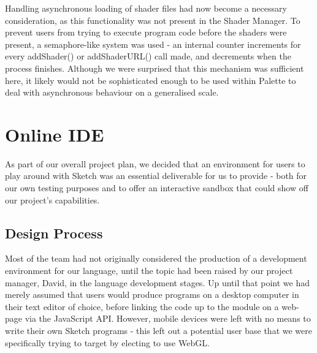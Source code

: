 \documentclass{l3proj}
\begin{document}
Handling asynchronous loading of shader files had now become a necessary consideration, as this functionality was not present in the Shader Manager. To prevent users from trying to execute program code before the shaders were present, a semaphore-like system was used - an internal counter increments for every addShader() or addShaderURL() call made, and decrements when the process finishes. Although we were surprised that this mechanism was sufficient here, it likely would not be sophisticated enough to be used within Palette to deal with asynchronous behaviour on a generalised scale.

\chapter{Online IDE}
\label{ide}
As part of our overall project plan, we decided that an environment for users to play around with Sketch was an essential deliverable for us to provide - both for our own testing purposes and to offer an interactive sandbox that could show off our project's capabilities.

\section{Design Process}
\label{ide-design}
Most of the team had not originally considered the production of a development environment for our language, until the topic had been raised by our project manager, David, in the language development stages. Up until that point we had merely assumed that users would produce programs on a desktop computer in their text editor of choice, before linking the code up to the module on a web-page via the JavaScript API. However, mobile devices were left with no means to write their own Sketch programs - this left out a potential user base that we were specifically trying to target by electing to use WebGL.
\end{document}
